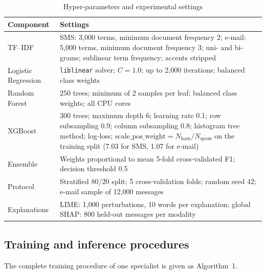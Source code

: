 \documentclass[12pt,a4paper]{report}
\begin{document}
\begin{table}[!htbp]
  \centering
  \caption{Hyper-parameters and experimental settings}
  \label{tab:hyper}
  \begin{tabular}{|L{3.4cm}|L{10.4cm}|}
    \hline
    \textbf{Component} & \textbf{Settings} \\
    \hline
    TF--IDF & SMS: 3,000 terms, minimum document frequency 2; e-mail: 5,000 terms, minimum document frequency 3; uni- and bi-grams; sublinear term frequency; accents stripped \\
    \hline
    Logistic Regression & \texttt{liblinear} solver; $C=1.0$; up to 2,000 iterations; balanced class weights \\
    \hline
    Random Forest & 250 trees; minimum of 2 samples per leaf; balanced class weights; all CPU cores \\
    \hline
    XGBoost & 300 trees; maximum depth 6; learning rate 0.1; row subsampling 0.9; column subsampling 0.8; histogram tree method; log-loss; $\mathrm{scale\_pos\_weight}=N_{\mathrm{ham}}/N_{\mathrm{spam}}$ on the training split (7.03 for SMS, 1.07 for e-mail) \\
    \hline
    Ensemble & Weights proportional to mean 5-fold cross-validated F1; decision threshold 0.5 \\
    \hline
    Protocol & Stratified 80/20 split; 5 cross-validation folds; random seed 42; e-mail sample of 12,000 messages \\
    \hline
    Explanations & LIME: 1,000 perturbations, 10 words per explanation; global SHAP: 800 held-out messages per modality \\
    \hline
  \end{tabular}
\end{table}

\subsection{Training and inference procedures}

The complete training procedure of one specialist is given as Algorithm~1.
\end{document}
